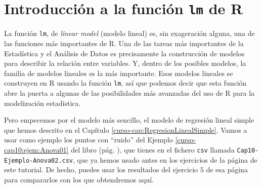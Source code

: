 \documentclass[10pt,a4paper]{article}\usepackage[]{graphicx}\usepackage[]{color}
\newcounter {cont01}
\begin{document}
\section{Introducción a la función {\tt lm} de R}
\label{tut10:sec:IntroduccionFuncionlm}


La función {\tt lm}, de {\em linear model} (modelo lineal) es, sin exageración alguna, una de las funciones más importantes de R. Una de las tareas más importantes de la Estadística y el Análisis de Datos es precisamente la construcción de modelos para describir la relación entre variables. Y, dentro de los posibles modelos, la familia de modelos lineales es la más importante. Esos modelos lineales se construyen en R usando la función {\tt lm}, así que podemos decir que esta función abre la puerta a algunas de las posibilidades más avanzadas del uso de R para la modelización estadística.

Pero empecemos por el modelo más sencillo, el modelo de regresión lineal simple que hemos descrito en el Capítulo \ref{curso-cap:RegresionLinealSimple}. Vamos a usar como ejemplo los puntos con ``ruido'' del Ejemplo \ref{curso-cap10:ejem:Anova01} del libro (pág. \pageref{curso-cap10:ejem:Anova01}), que tienes en el fichero {\tt csv} llamada {\tt Cap10-Ejemplo-Anova02.csv}, que ya hemos usado antes en los ejercicios de la página \pageref{tut10:ejercicio03} de este tutorial. De hecho, puedes usar los resultados del ejercicio $5$ de esa página para  compararlos con los que obtendremos aquí.
\end{document}

